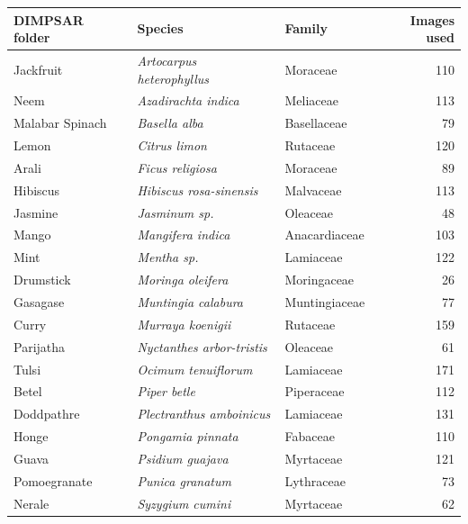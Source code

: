 \begin{tabular}{lllr}
\toprule
DIMPSAR folder & Species & Family & Images used \\
\midrule
Jackfruit & \textit{Artocarpus heterophyllus} & Moraceae & 110 \\
Neem & \textit{Azadirachta indica} & Meliaceae & 113 \\
Malabar Spinach & \textit{Basella alba} & Basellaceae & 79 \\
Lemon & \textit{Citrus limon} & Rutaceae & 120 \\
Arali & \textit{Ficus religiosa} & Moraceae & 89 \\
Hibiscus & \textit{Hibiscus rosa-sinensis} & Malvaceae & 113 \\
Jasmine & \textit{Jasminum sp.} & Oleaceae & 48 \\
Mango & \textit{Mangifera indica} & Anacardiaceae & 103 \\
Mint & \textit{Mentha sp.} & Lamiaceae & 122 \\
Drumstick & \textit{Moringa oleifera} & Moringaceae & 26 \\
Gasagase & \textit{Muntingia calabura} & Muntingiaceae & 77 \\
Curry & \textit{Murraya koenigii} & Rutaceae & 159 \\
Parijatha & \textit{Nyctanthes arbor-tristis} & Oleaceae & 61 \\
Tulsi & \textit{Ocimum tenuiflorum} & Lamiaceae & 171 \\
Betel & \textit{Piper betle} & Piperaceae & 112 \\
Doddpathre & \textit{Plectranthus amboinicus} & Lamiaceae & 131 \\
Honge & \textit{Pongamia pinnata} & Fabaceae & 110 \\
Guava & \textit{Psidium guajava} & Myrtaceae & 121 \\
Pomoegranate & \textit{Punica granatum} & Lythraceae & 73 \\
Nerale & \textit{Syzygium cumini} & Myrtaceae & 62 \\
\bottomrule
\end{tabular}